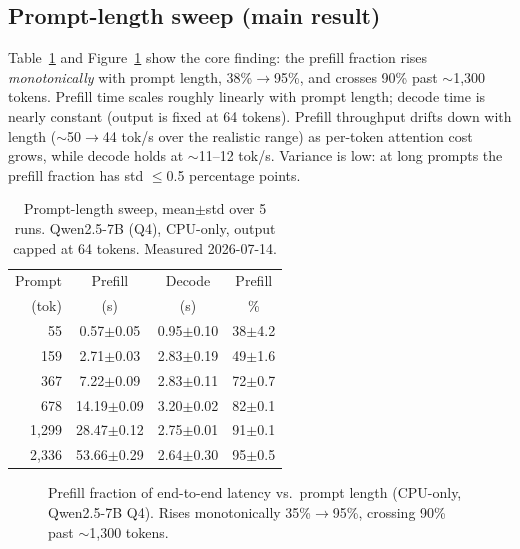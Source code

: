 \documentclass[10pt,twocolumn]{article}
\begin{document}
\subsection{Prompt-length sweep (main result)}
\label{sec:results-promptlen}
Table~\ref{tab:sweep} and Figure~\ref{fig:promptlen} show the core finding:
the prefill fraction rises \emph{monotonically} with prompt length,
38\%$\rightarrow$95\%, and crosses 90\% past $\sim$1{,}300 tokens. Prefill
time scales roughly linearly with prompt length; decode time is nearly
constant (output is fixed at 64 tokens). Prefill throughput drifts down
with length ($\sim$50$\rightarrow$44 tok/s over the realistic range) as
per-token attention cost grows, while decode holds at $\sim$11--12 tok/s.
Variance is low: at long prompts the prefill fraction has std $\leq$0.5
percentage points.

\begin{table}[t]
  \centering
  \caption{Prompt-length sweep, mean$\pm$std over 5 runs. Qwen2.5-7B (Q4),
  CPU-only, output capped at 64 tokens. Measured 2026-07-14.}
  \label{tab:sweep}
  \begin{tabular}{rccc}
    \toprule
    Prompt & Prefill & Decode & Prefill \\
    (tok)  & (s)     & (s)    & \% \\
    \midrule
    55      & 0.57$\pm$0.05  & 0.95$\pm$0.10 & 38$\pm$4.2 \\
    159     & 2.71$\pm$0.03  & 2.83$\pm$0.19 & 49$\pm$1.6 \\
    367     & 7.22$\pm$0.09  & 2.83$\pm$0.11 & 72$\pm$0.7 \\
    678     & 14.19$\pm$0.09 & 3.20$\pm$0.02 & 82$\pm$0.1 \\
    1{,}299 & 28.47$\pm$0.12 & 2.75$\pm$0.01 & 91$\pm$0.1 \\
    2{,}336 & 53.66$\pm$0.29 & 2.64$\pm$0.30 & 95$\pm$0.5 \\
    \bottomrule
  \end{tabular}
\end{table}

\begin{figure}[t]
  \centering
  \caption{Prefill fraction of end-to-end latency vs.\ prompt length
  (CPU-only, Qwen2.5-7B Q4). Rises monotonically 35\%$\rightarrow$95\%,
  crossing 90\% past $\sim$1{,}300 tokens.}
  \label{fig:promptlen}
\end{figure}
\end{document}
